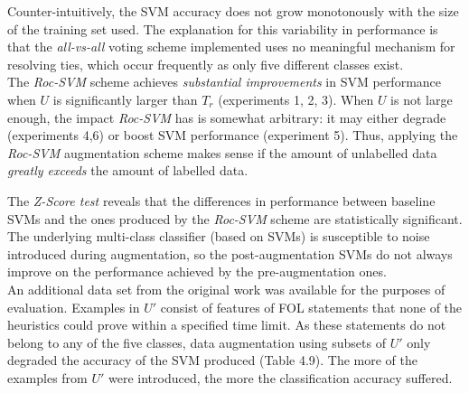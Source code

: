 \documentclass[12pt,twoside,notitlepage,amsart]{report} %
\begin{document}
Counter-intuitively, the SVM accuracy does not grow monotonously with the size of the training set used. The explanation for this variability in performance is that the \emph{all-vs-all} voting scheme implemented uses no meaningful mechanism for resolving ties, which occur frequently as only five different classes exist. \\

The \emph{Roc-SVM} scheme achieves \emph{substantial improvements} in SVM performance when $U$ is significantly larger than $T_r$ (experiments 1, 2, 3). When $U$ is not large enough, the impact \emph{Roc-SVM} has is somewhat arbitrary: it may either degrade (experiments 4,6) or boost SVM performance (experiment 5). Thus, applying the \emph{Roc-SVM} augmentation scheme makes sense if the amount of unlabelled data \emph{greatly exceeds} the amount of labelled data.
	
The \emph{Z-Score test} reveals that the differences in performance between baseline SVMs and the ones produced by the \emph{Roc-SVM} scheme are {statistically significant}. The underlying multi-class classifier (based on SVMs) is susceptible to noise introduced during augmentation, so the post-augmentation SVMs {do not always improve} on the performance achieved by the pre-augmentation ones. \\

An additional data set from the original work \cite{Bridge13} was available for the purposes of evaluation. Examples in $U'$ consist of features of FOL statements that none of the heuristics could prove within a specified time limit. As these statements do not belong to any of the five classes, data augmentation using subsets of $U'$ only degraded the accuracy of the SVM produced (Table 4.9). The more of the examples from $U'$ were introduced, the more the classification accuracy suffered.  \\
\end{document}
